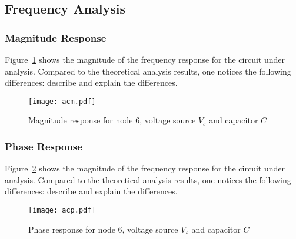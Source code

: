 \subsection{Frequency Analysis}

\subsubsection{Magnitude Response}

Figure~\ref{fig:acm} shows the magnitude of the frequency response for the
circuit under analysis. Compared to the theoretical analysis results, one
notices the following differences: describe and explain the differences.

\begin{figure}[H] \centering
\texttt{[image: acm.pdf]}
\caption{Magnitude response for node 6, voltage source $V_s$ and capacitor $C$}
\label{fig:acm}
\end{figure}



\subsubsection{Phase Response}

Figure~\ref{fig:acp} shows the magnitude of the frequency response for the
circuit under analysis. Compared to the theoretical analysis results, one
notices the following differences: describe and explain the differences.

\begin{figure}[H] \centering
\texttt{[image: acp.pdf]}
\caption{Phase response for node 6, voltage source $V_s$ and capacitor $C$}
\label{fig:acp}
\end{figure}

